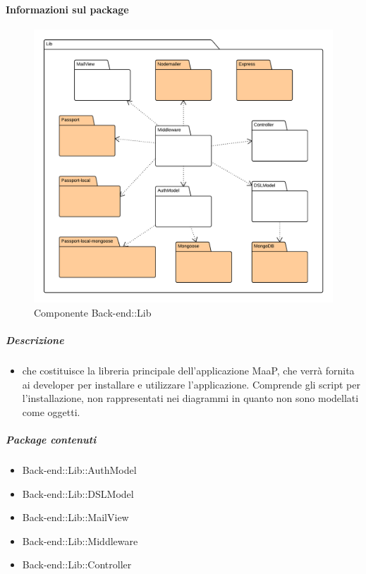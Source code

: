   \paragraph{Informazioni sul package} 
    \begin{figure}[H] 
      \begin{center} 
        \includegraphics[width=\textwidth]{packages/Back-end::Lib.png}  
        \caption{Componente Back-end::Lib}
      \end{center}  
    \end{figure} 
  \subparagraph{Descrizione} 
    \begin{itemize}
    \item[]  che costituisce la libreria principale dell'applicazione MaaP, che verrà fornita ai developer per installare e utilizzare l'applicazione. Comprende gli script per l'installazione, non rappresentati nei diagrammi in quanto non sono modellati come oggetti.
    \end{itemize} 
    \subparagraph{Package contenuti} 
    \begin{itemize}
        \item Back-end::Lib::AuthModel
        \item Back-end::Lib::DSLModel
        \item Back-end::Lib::MailView
        \item Back-end::Lib::Middleware
        \item Back-end::Lib::Controller
    \end{itemize}
